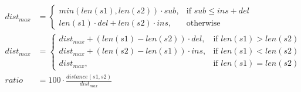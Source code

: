 \documentclass{article}
\begin{document}
\begin{align*} \\ dist_{max} &= \begin{cases} min(len(s1), len(s2)) \cdot sub, & \text{if } sub \leq ins + del \\ len(s1) \cdot del + len(s2) \cdot ins, & \text{otherwise} \end{cases}\\[10pt] dist_{max} &= \begin{cases} dist_{max} + (len(s1) - len(s2)) \cdot del, & \text{if } len(s1) > len(s2) \\ dist_{max} + (len(s2) - len(s1)) \cdot ins, & \text{if } len(s1) < len(s2) \\ dist_{max}, & \text{if } len(s1) = len(s2) \end{cases}\\[10pt] ratio &= 100 \cdot \frac{distance(s1, s2)}{dist_{max}} \end{align*}
\pagebreak
\end{document}
